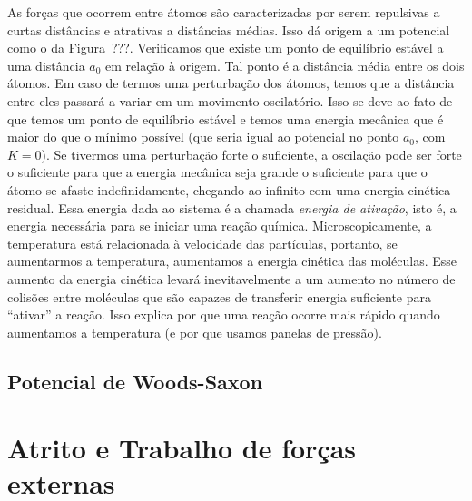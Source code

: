 As forças que ocorrem entre átomos são caracterizadas por serem repulsivas a curtas distâncias e atrativas a distâncias médias. Isso dá origem a um potencial como o da Figura~???. Verificamos que existe um ponto de equilíbrio estável a uma distância $a_0$ em relação à origem. Tal ponto é a distância média entre os dois átomos. Em caso de termos uma perturbação dos átomos, temos que a distância entre eles passará a variar em um movimento oscilatório. Isso se deve ao fato de que temos um ponto de equilíbrio estável e temos uma energia mecânica que é maior do que o mínimo possível (que seria igual ao potencial no ponto $a_0$, com $K=0$). Se tivermos uma perturbação forte o suficiente, a oscilação pode ser forte o suficiente para que a energia mecânica seja grande o suficiente para que o átomo se afaste indefinidamente, chegando ao infinito com uma energia cinética residual. Essa energia dada ao sistema é a chamada \emph{energia de ativação}, isto é, a energia necessária para se iniciar uma reação química. Microscopicamente, a temperatura está relacionada à velocidade das partículas, portanto, se aumentarmos a temperatura, aumentamos a energia cinética das moléculas. Esse aumento da energia cinética levará inevitavelmente a um aumento no número de colisões entre moléculas que são capazes de transferir energia suficiente para ``ativar'' a reação. Isso explica por que uma reação ocorre mais rápido quando aumentamos a temperatura (e por que usamos panelas de pressão).

\subsection{Potencial de Woods-Saxon}

\section{Atrito e Trabalho de forças externas}

